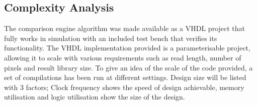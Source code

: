 \subsection{Complexity Analysis}
The comparison engine algorithm was made available as a VHDL project that fully works in simulation with an included test bench that verifies its functionality. The VHDL implementation provided is a parameterisable project, allowing it to scale with various requirements such as read length, number of pixels and result library size. To give an idea of the scale of the code provided, a set of compilations has been run at different settings. Design size will be listed with 3 factors; Clock frequency shows the speed of design achievable, memory utilisation and logic utilisation show the size of the design.



